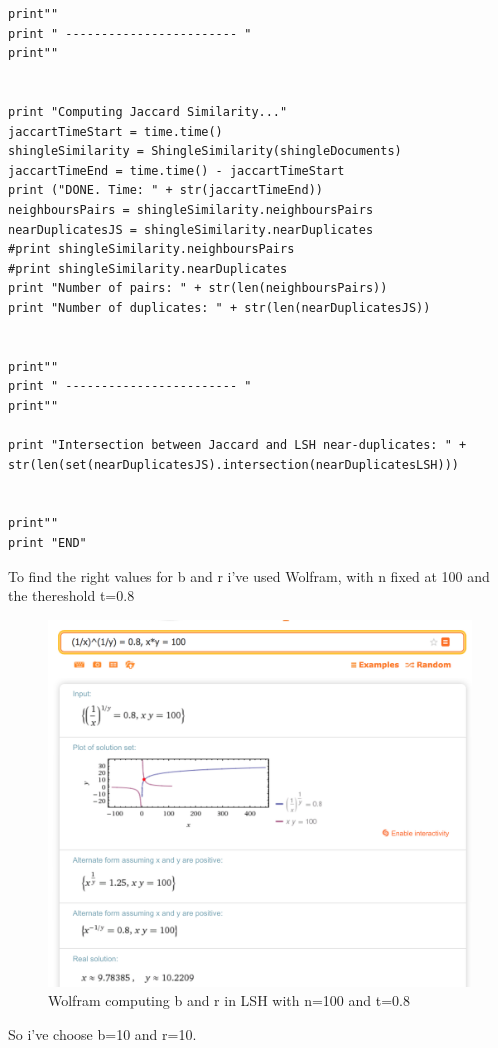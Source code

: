 \documentclass{article}
\begin{document}
\begin{lstlisting}
print""
print " ------------------------ "
print""


print "Computing Jaccard Similarity..."
jaccartTimeStart = time.time()
shingleSimilarity = ShingleSimilarity(shingleDocuments)
jaccartTimeEnd = time.time() - jaccartTimeStart
print ("DONE. Time: " + str(jaccartTimeEnd))
neighboursPairs = shingleSimilarity.neighboursPairs
nearDuplicatesJS = shingleSimilarity.nearDuplicates
#print shingleSimilarity.neighboursPairs
#print shingleSimilarity.nearDuplicates
print "Number of pairs: " + str(len(neighboursPairs))
print "Number of duplicates: " + str(len(nearDuplicatesJS))


print""
print " ------------------------ "
print""

print "Intersection between Jaccard and LSH near-duplicates: " + str(len(set(nearDuplicatesJS).intersection(nearDuplicatesLSH)))


print""
print "END"\end{lstlisting}


\newpage


To find the right values for b and r i've used Wolfram, with n fixed at 100 and the thereshold t=0.8 \\
\begin{figure} [h]
\centering
\includegraphics[width=150mm]{wolfram1010}
\caption{Wolfram computing b and r in LSH with n=100 and t=0.8  \label{wolfram1}}
\end{figure}

So i've choose b=10 and r=10. \\
\end{document}
